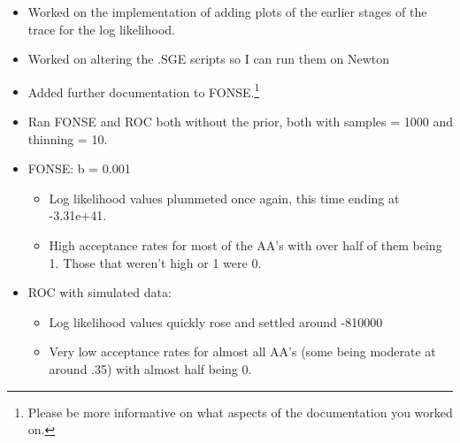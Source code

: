 \documentclass[11pt]{labbook}
\begin{document}
    \begin{itemize}
        \item Worked on the implementation of adding plots of the earlier stages of the trace for the log likelihood.
        \item Worked on altering the .SGE scripts so I can run them on Newton
        \item Added further documentation to FONSE.\footnote{Please be more informative on what aspects of the documentation you worked on.}
        \item Ran FONSE and ROC both without the prior, both with samples = 1000 and thinning = 10.
        \item FONSE: b = 0.001
        \begin{itemize}
            \item Log likelihood values plummeted once again, this time ending at -3.31e+41.
            \item High acceptance rates for most of the AA's with over half of them being 1. Those that weren't high or 1 were 0.
        \end{itemize}
        \item ROC with simulated data:
        \begin{itemize}
            \item Log likelihood values quickly rose and settled around -810000
            \item Very low acceptance rates for almost all AA's (some being moderate at around .35) with almost half being 0.
        \end{itemize}
    \end{itemize}
    
\end{document}
